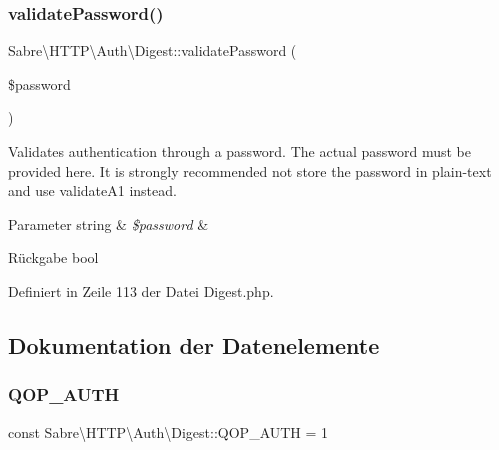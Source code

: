 \mbox{\label{class_sabre_1_1_h_t_t_p_1_1_auth_1_1_digest_a4bc25689fa17ba401cab58832cc62c25}} 
\subsubsection{\texorpdfstring{validate\+Password()}{validatePassword()}}
{\footnotesize\ttfamily Sabre\textbackslash{}\+H\+T\+T\+P\textbackslash{}\+Auth\textbackslash{}\+Digest\+::validate\+Password (\begin{DoxyParamCaption}\item[{}]{\$password }\end{DoxyParamCaption})}

Validates authentication through a password. The actual password must be provided here. It is strongly recommended not store the password in plain-\/text and use validate\+A1 instead.


\begin{DoxyParams}[1]{Parameter}
string & {\em \$password} & \\
\hline
\end{DoxyParams}
\begin{DoxyReturn}{Rückgabe}
bool 
\end{DoxyReturn}


Definiert in Zeile 113 der Datei Digest.\+php.



\subsection{Dokumentation der Datenelemente}
\mbox{\label{class_sabre_1_1_h_t_t_p_1_1_auth_1_1_digest_afa5c1b1dc098039d2a3b4f9fcd655ce8}} 
\subsubsection{\texorpdfstring{Q\+O\+P\+\_\+\+A\+U\+TH}{QOP\_AUTH}}
{\footnotesize\ttfamily const Sabre\textbackslash{}\+H\+T\+T\+P\textbackslash{}\+Auth\textbackslash{}\+Digest\+::\+Q\+O\+P\+\_\+\+A\+U\+TH = 1}

